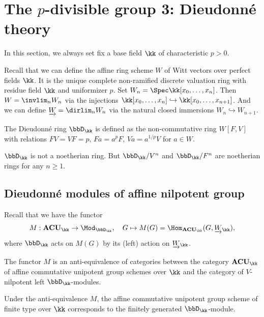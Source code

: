 \section[The p-divisible group 3: Dieudonn\'e theory]{The $p$-divisible group 3: Dieudonn\'e theory}

In this section, we always set fix a base field $\kk$ of characteristic $p>0$.

Recall that we can define the affine ring scheme $W$ of Witt vectors over perfect fields $\kk$.
It is the unique complete non-ramified discrete valuation ring with residue field $\kk$ and uniformizer $p$.
Set $W_n = \Spec \kk[x_0, \ldots, x_n]$.
Then $W = \invlim_n W_n$ via the injections $\kk[x_0, \ldots, x_n] \hookrightarrow \kk[x_0, \ldots, x_{n+1}]$.
And we can define $\underrightarrow{W} = \dirlim_n W_n$ via the natural closed immersions $W_n \hookrightarrow W_{n+1}$.

The Dieudonn\'e ring $\bbD_\kk$ is defined as the non-commutative ring $W[F,V]$ with relations $FV = VF = p$, $F a = a^p F$, $V a = a^{1/p} V$ for $a \in W$.

\begin{proposition}
	$\bbD_\kk$ is not a noetherian ring.
	But $\bbD_\kk/V^n$ and $\bbD_\kk/F^n$ are noetherian rings for any $n \ge 1$.
\end{proposition}



\subsection{Dieudonn\'e modules of affine nilpotent group}

Recall that we have the functor
\[ M : \mathbf{ACU}_\kk \to \Mod_{\bbD_\kk}, \quad G \mapsto M(G) = \Hom_{\mathbf{ACU}_\kk}(G, \CW_\kk), \]
where $\bbD_\kk$ acts on $M(G)$ by its (left) action on $\CW_\kk$.

\begin{theorem}\label{thm:dieudonne-anti-equivalence}
	The functor $M$ is an anti-equivalence of categories between the category $\mathbf{ACU}_\kk$ of affine commutative unipotent group schemes over $\kk$ and the category of $V$-nilpotent left $\bbD_\kk$-modules.
\end{theorem}
\begin{remark}
	Under the anti-equivalence $M$, the affine commutative unipotent group scheme of finite type over $\kk$ corresponds to the finitely generated $\bbD_\kk$-module.
\end{remark}

